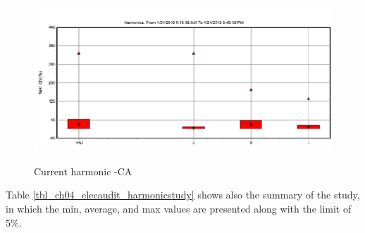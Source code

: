 \begin{figure}[!htb]
	\includegraphics[width=\textwidth]{figures/fig_ch04_elecaudit_harmonicstudy06} \\
	\caption{Current harmonic -CA}
	\label{fig_ch04_elecaudit_harmonicstudy06} 
\end{figure}

Table \ref{tbl_ch04_elecaudit_harmonicstudy} shows also the summary of the study, in which the min, average, and max values are presented along with the limit of 5\%.

